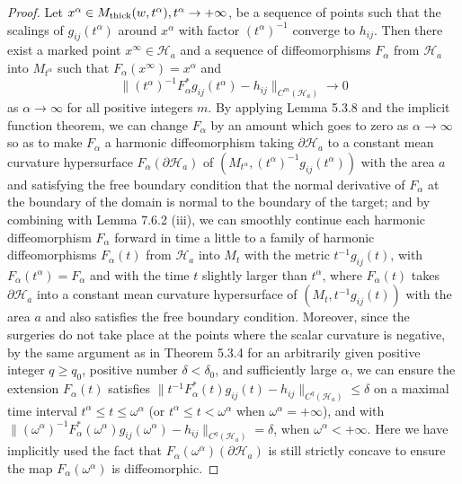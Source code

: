 \begin{proof}
Let $x^{\alpha}\in M_{\rm
thick}(w,t^{\alpha}),t^{\alpha}\rightarrow+\infty$, be a sequence
of points such that the scalings of $g_{ij}(t^{\alpha})$ around
$x^{\alpha}$ with factor $(t^{\alpha})^{-1}$ converge to $h_{ij}$.
Then there exist a marked point $x^{\infty}\in \mathcal{H}_a$ and
a sequence of diffeomorphisms $F_{\alpha}$ from $\mathcal{H}_a$
into $M_{t^{\alpha}}$ such that
$F_{\alpha}(x^{\infty})=x^{\alpha}$ and
$$
\|(t^{\alpha})^{-1}F^*_{\alpha}g_{ij}(t^{\alpha})
-h_{ij}\|_{C^m(\mathcal{H}_a)}\rightarrow 0
$$
as $\alpha\rightarrow\infty$ for all positive integers $m$. By
applying Lemma 5.3.8 and the implicit function theorem, we can
change $F_{\alpha}$ by an amount which goes to zero as
$\alpha\rightarrow\infty$ so as to make $F_{\alpha}$ a harmonic
diffeomorphism taking $\partial \mathcal{H}_a$ to a constant mean
curvature hypersurface $F_{\alpha}(\partial \mathcal{H}_a)$ of
$(M_{t^{\alpha}},(t^{\alpha})^{-1}g_{ij}(t^{\alpha}))$ with the
area $a$ and satisfying the free boundary condition that the
normal derivative of $F_{\alpha}$ at the boundary of the domain is
normal to the boundary of the target; and by combining with Lemma
7.6.2 (iii), we can smoothly continue each harmonic diffeomorphism
$F_{\alpha}$ forward in time a little to a family of harmonic
diffeomorphisms $F_{\alpha}(t)$ from $\mathcal{H}_a$ into $M_t$
with the metric $t^{-1}g_{ij}(t)$, with
$F_{\alpha}(t^{\alpha})=F_{\alpha}$ and with the time $t$ slightly
larger than $t^{\alpha}$, where $F_{\alpha}(t)$ takes $\partial
\mathcal{H}_a$ into a constant mean curvature hypersurface of
$(M_t,t^{-1}g_{ij}(t))$ with the area $a$ and also satisfies the
free boundary condition. Moreover, since the surgeries do not take
place at the points where the scalar curvature is negative, by the
same argument as in Theorem 5.3.4 for an arbitrarily given
positive integer $q\geq q_0$, positive number $\delta<\delta_0$,
and sufficiently large $\alpha$, we can ensure the extension
$F_{\alpha}(t)$ satisfies
$\|t^{-1}F^*_{\alpha}(t)g_{ij}(t)-h_{ij}\|_{C^q(\mathcal{H}_a)}\leq
\delta$ on a maximal time interval $t^{\alpha}\leq t\leq
\omega^{\alpha}$ (or $t^{\alpha}\leq t< \omega^{\alpha}$ when
$\omega^{\alpha}=+\infty$), and with
$\|(\omega^{\alpha})^{-1}F^*_{\alpha}
(\omega^{\alpha})g_{ij}(\omega^{\alpha})-h_{ij}\|_{C^q(\mathcal{H}_a)}=
\delta$, when $\omega^{\alpha}<+\infty$. Here we have implicitly
used the fact that $F_{\alpha}(\omega^{\alpha})(\partial
\mathcal{H}_a)$ is still strictly concave to ensure the map
$F_{\alpha}(\omega^{\alpha})$ is diffeomorphic.


\end{proof}
